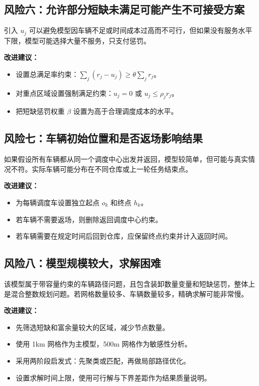\documentclass[UTF8,a4paper,12pt]{ctexart}
\begin{document}
\subsection{风险六：允许部分短缺未满足可能产生不可接受方案}

引入 \(u_j\) 可以避免模型因车辆不足或时间成本过高而不可行，但如果没有服务水平下限，模型可能选择大量不服务，只支付惩罚。

\textbf{改进建议：}

\begin{itemize}
  \item 设置总满足率约束：\(\sum_j (r_j-u_j)\ge \theta \sum_j r_j\)。
  \item 对重点区域设置强制满足约束：\(u_j=0\) 或 \(u_j\le \rho_j r_j\)。
  \item 把短缺惩罚权重 \(\beta\) 设置为高于合理调度成本的水平。
\end{itemize}

\subsection{风险七：车辆初始位置和是否返场影响结果}

如果假设所有车辆都从同一个调度中心出发并返回，模型较简单，但可能与真实情况不符。实际车辆可能分布在不同仓库或上一轮任务结束点。

\textbf{改进建议：}

\begin{itemize}
  \item 为每辆调度车设置独立起点 \(o_k\) 和终点 \(h_k\)。
  \item 若车辆不需要返场，则删除返回调度中心约束。
  \item 若车辆需要在规定时间后回到仓库，应保留终点约束并计入返回时间。
\end{itemize}

\subsection{风险八：模型规模较大，求解困难}

该模型属于带容量约束的车辆路径问题，且包含装卸数量变量和短缺惩罚，整体上是混合整数规划问题。若网格数量较多、车辆数量较多，精确求解可能非常慢。

\textbf{改进建议：}

\begin{itemize}
  \item 先筛选短缺和富余量较大的区域，减少节点数量。
  \item 使用 1km 网格作为主模型，500m 网格作为敏感性分析。
  \item 采用两阶段启发式：先聚类或匹配，再做局部路径优化。
  \item 设置求解时间上限，使用可行解与下界差距作为结果质量说明。
\end{itemize}
\end{document}
